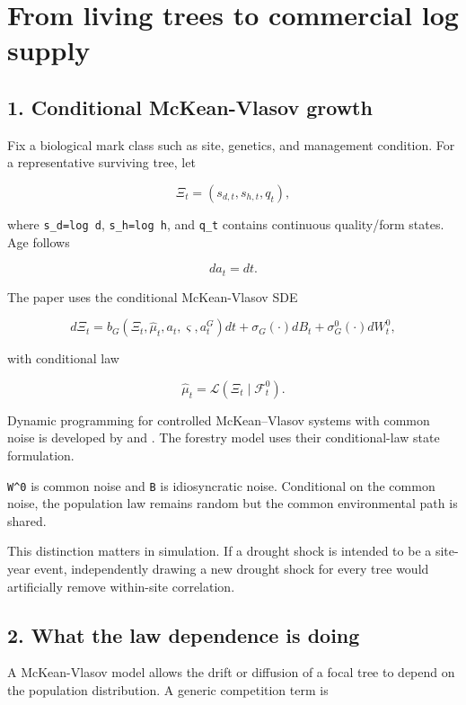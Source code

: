 \section{From living trees to commercial log supply}\label{from-living-trees-to-commercial-log-supply}

\subsection{1. Conditional McKean-Vlasov growth}\label{conditional-mckean-vlasov-growth}

Fix a biological mark class such as site, genetics, and management condition.
For a representative surviving tree, let

\[
\Xi_t=(s_{d,t},s_{h,t},q_t),
\]

where \texttt{s\_d=log\ d}, \texttt{s\_h=log\ h}, and \texttt{q\_t} contains continuous quality/form
states. Age follows

\[
da_t=dt.
\]

The paper uses the conditional McKean-Vlasov SDE

\[
d\Xi_t=b_G(\Xi_t,\hat\mu_t,a_t,\varsigma,a_t^G)dt
+\sigma_G(\cdot)dB_t
+\sigma_G^0(\cdot)dW_t^0,
\]

with conditional law

\[
\hat\mu_t=\mathcal L(\Xi_t\mid\mathcal F_t^0).
\]

Dynamic programming for controlled McKean--Vlasov systems with common noise is
developed by \citet{pham2017dynamic} and \citet{djete2019dynamic}. The forestry
model uses their conditional-law state formulation.

\texttt{W\^{}0} is common noise and \texttt{B} is idiosyncratic noise. Conditional on the common
noise, the population law remains random but the common environmental path is
shared.

This distinction matters in simulation. If a drought shock is intended to be a
site-year event, independently drawing a new drought shock for every tree would
artificially remove within-site correlation.

\subsection{2. What the law dependence is doing}\label{what-the-law-dependence-is-doing}

A McKean-Vlasov model allows the drift or diffusion of a focal tree to depend on
the population distribution. A generic competition term is

